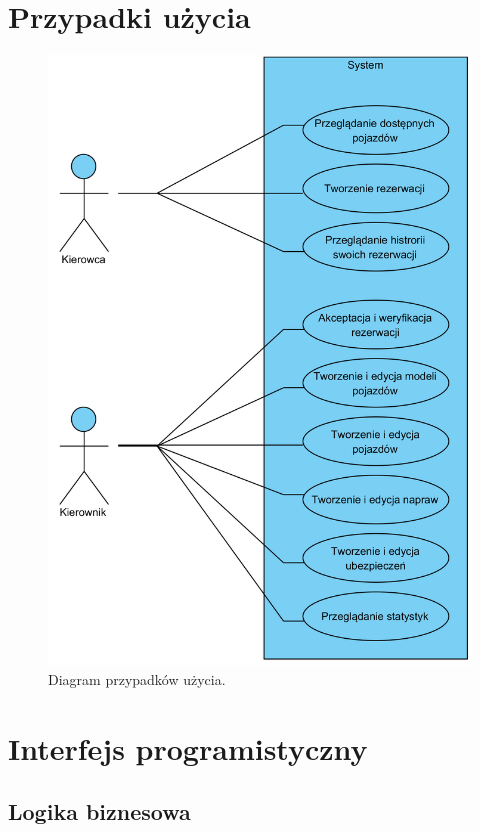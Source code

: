 \documentclass[eng,printmode,openany]{mgr}
\begin{document}
	\newpage
	\section{Przypadki użycia}	
	\begin{figure}[H]
		\centering
		\includegraphics[width=\textwidth]{images/use_case_1.png}
		\caption{Diagram przypadków użycia.}
	\end{figure}
	
	
	\newpage
	\section{Interfejs programistyczny}
	\subsection{Logika biznesowa}
			
\end{document}
